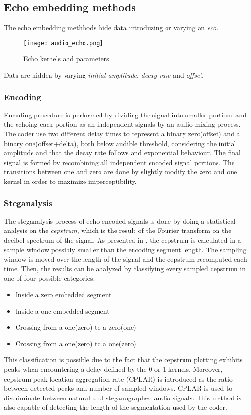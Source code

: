 \documentclass[../../main.tex]{subfiles}
\begin{document}
\subsection{Echo embedding methods}
The echo embedding methhods hide data introduzing or varying an \emph{eco}.
\begin{figure}[h]
    \centering
    \caption{Echo kernels and parameters}
    \texttt{[image: audio\_echo.png]}
\end{figure}
Data are hidden by varying \emph{initial amplitude}, \emph{decay rate} and
\emph{offset}.
\subsubsection{Encoding}
Encoding procedure is performed by dividing the signal into smaller
portions and the echoing each portion as an independent signals by an audio
mixing process.
The coder use two different delay times to represent a binary zero(offset)
and a binary one(offset+delta), both below audible threshold, considering
the initial amplitude and that the decay rate follows and exponential
behaviour.
The final signal is formed by recombining all independent encoded signal
portions.
The transitions between one and zero are done by slightly modify the zero
and one kernel in order to maximize imperceptibility.
\subsubsection{Steganalysis}
The steganalysis process of echo encoded signals is done by doing a
statistical analysis on the \emph{cepstrum}, which is the result of the
Fourier transform on the decibel spectrum of the signal.
As presented in \cite{review-audio-steganalysis}, the cepstrum is calculated
in a sample window possibly smaller than the encoding segment length.
The sampling window is moved over the length of the signal and the cepstrum
recomputed each time.
Then, the results can be analyzed by classifying every sampled cepstrum in
one of four possible categories:
\begin{itemize}[noitemsep]
    \item Inside a zero embedded segment
    \item Inside a one embedded segment
    \item Crossing from a one(zero) to a zero(one)
    \item Crossing from a one(zero) to a one(zero)
\end{itemize}
This classification is possible due to the fact that the cepstrum plotting
exhibits peaks when encountering a delay defined by the 0 or 1 kernels.
Moreover, cepstrum peak location aggregation rate (CPLAR) is introduced as
the ratio between detected peaks and number of sampled windows.
CPLAR is used to discriminate between natural and steganographed audio
signals.
This method is also capable of detecting the length of the segmentation
used by the coder.
\end{document}
